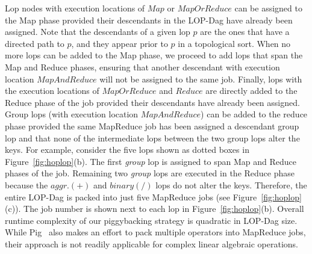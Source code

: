 Lop nodes with
execution locations of $Map$ or $MapOrReduce$ can be assigned to the Map phase provided their
descendants in the LOP-Dag have already been assigned. 
Note that the descendants of a given lop $p$ are the ones that have a directed path to $p$, and they appear prior to $p$ in a topological sort. 
When no more lops can be added to the Map phase, we proceed to add lops that span the Map and Reduce phases, ensuring that another
descendant with execution location $MapAndReduce$ will not be assigned to the same job. Finally,
lops with the execution locations of $MapOrReduce$ and $Reduce$ are directly added to the Reduce
phase of the job provided their descendants have already been assigned. Group lops (with execution
location $MapAndReduce$) can be added to the reduce phase provided the same MapReduce job has been
assigned a descendant group lop and that none of the intermediate lops between the two group lops
alter the keys. 
For example, consider the five lops shown as dotted boxes in Figure~\ref{fig:hoplop}(b). 
The first {\em group} lop is assigned to span Map and Reduce phases of the job. 
Remaining two {\em group} lops are executed in the Reduce phase because the $aggr.(+)$ and $binary(/)$ lops do not alter the keys.
Therefore, the entire LOP-Dag is packed into just five MapReduce jobs (see Figure~\ref{fig:hoplop}(c)). 
The job number is shown next to each lop in Figure~\ref{fig:hoplop}(b). Overall runtime complexity of our piggybacking strategy is quadratic in LOP-Dag size.
While Pig~\cite{pig} also makes an effort to pack multiple operators into MapReduce jobs, their approach is not readily applicable for complex linear algebraic operations.



